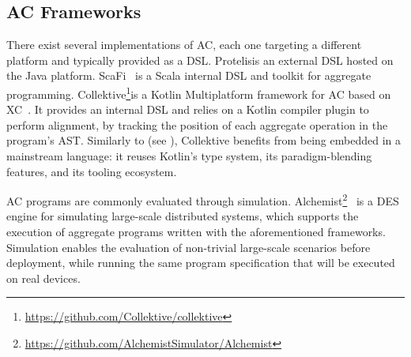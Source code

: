 \subsection{\acl{AC} Frameworks}
\label{subsec:ac-frameworks}

There exist several implementations of \ac{AC},
each one targeting a different platform
and typically provided as a \ac{DSL}.
%
Protelis\missingref[Protelis] is an external \ac{DSL} hosted on the Java platform.
%
ScaFi~\cite{DBLP:journals/softx/CasadeiVAP22} is a Scala internal \ac{DSL} and toolkit for aggregate programming.
%
Collektive\footnote{\url{https://github.com/Collektive/collektive}}\missingref[Collektive]
is a Kotlin Multiplatform framework for \ac{AC} based on \ac{XC}~\cite{audrito2024jss}.
%
It provides an internal \ac{DSL}
and relies on a Kotlin compiler plugin to perform alignment,
by tracking the position of each aggregate operation in the program's \ac{AST}.
%
Similarly to \jakta{} (see ),
Collektive benefits from being embedded in a mainstream language:
it reuses Kotlin's type system,
its paradigm-blending features,
and its tooling ecosystem.

\ac{AC} programs are commonly evaluated through simulation.
%
Alchemist\footnote{\url{https://github.com/AlchemistSimulator/Alchemist}}~\cite{PianiniJOS2013}
is a \ac{DES} engine for simulating large-scale distributed systems,
which supports the execution of aggregate programs written with the aforementioned frameworks.
%
Simulation enables the evaluation of non-trivial large-scale scenarios
before deployment,
while running the same program specification that will be executed on real devices.
